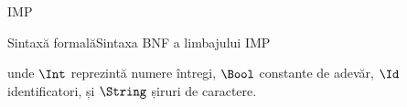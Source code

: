 \documentclass[xcolor=pdftex,romanian,colorlinks]{beamer}
\begin{document}
\begin{subsection}{IMP}
\begin{comment}
\alert{\renewcommand{\syntaxKeyword}{}\syntax[\Stmt]{\color{black}\Sif\;\terminal{(}\BExp\terminal{)}\Block\Selse\Block}{}
	\syntaxCont[\Stmt]{\color{black}\Id \terminal{=}\AExp\terminal{;}}{}}
   \item Categorii sintactice (neterminale, încep cu majusculă)
   \begin{itemize}
    \item descriu tipurile de sintaxă
     \begin{itemize}
      \item Tipuri lexicale: %
	  \item Tipuri construite:
     \end{itemize}
   \end{itemize}
   \item Cuvinte cheie (terminale, încep cu literă mică sau simboluri)
   \begin{itemize}
    \item descriu elementele lexicale:
   $\Sif$, $\Selse$, $\Sint$,
   $\Swhile$,
   $\terminal{<=}$,
   $\terminal{\&\&}$, $\terminal{!}$,
   $\terminal{+}$, $\terminal{=}$, $\terminal{;}$, $\terminal{(}$, $\terminal{)}$, \ldots
   \end{itemize}
  \end{itemize}
 \end{frame}
\end{comment}

\begin{frame}{Sintaxă formală}{Sintaxa BNF a limbajului IMP}
\vspace{-5ex}
unde $\Int$ reprezintă numere întregi, $\Bool$ constante de adevăr, $\Id$ identificatori,
și $\String$ șiruri de caractere.
\end{frame}
\end{subsection}
\end{document}
